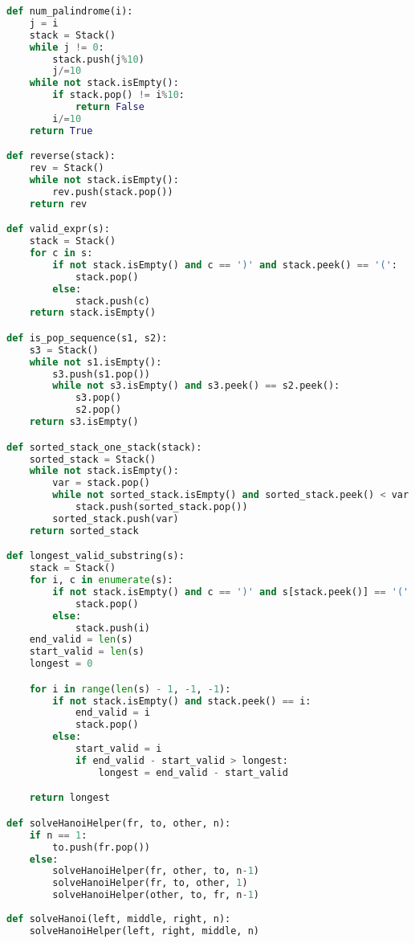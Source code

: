 \documentclass{article}
\begin{document}
\begin{lstlisting}[language=Python]
def num_palindrome(i):
    j = i
    stack = Stack()
    while j != 0:
        stack.push(j%10)
        j/=10
    while not stack.isEmpty():
        if stack.pop() != i%10:
            return False
        i/=10
    return True

def reverse(stack):
    rev = Stack()
    while not stack.isEmpty():
        rev.push(stack.pop())
    return rev

def valid_expr(s):
    stack = Stack()
    for c in s:
        if not stack.isEmpty() and c == ')' and stack.peek() == '(':
            stack.pop()
        else:
            stack.push(c)
    return stack.isEmpty()

def is_pop_sequence(s1, s2):
    s3 = Stack()
    while not s1.isEmpty():
        s3.push(s1.pop())
        while not s3.isEmpty() and s3.peek() == s2.peek():
            s3.pop()
            s2.pop()
    return s3.isEmpty()

def sorted_stack_one_stack(stack):
    sorted_stack = Stack()
    while not stack.isEmpty():
        var = stack.pop()
        while not sorted_stack.isEmpty() and sorted_stack.peek() < var:
            stack.push(sorted_stack.pop())
        sorted_stack.push(var)
    return sorted_stack

def longest_valid_substring(s):
    stack = Stack()
    for i, c in enumerate(s):
        if not stack.isEmpty() and c == ')' and s[stack.peek()] == '(':
            stack.pop()
        else:
            stack.push(i)
    end_valid = len(s)
    start_valid = len(s)
    longest = 0

    for i in range(len(s) - 1, -1, -1):
        if not stack.isEmpty() and stack.peek() == i:
            end_valid = i
            stack.pop()
        else:
            start_valid = i
            if end_valid - start_valid > longest:
                longest = end_valid - start_valid

    return longest

def solveHanoiHelper(fr, to, other, n):
    if n == 1:
        to.push(fr.pop())
    else:
        solveHanoiHelper(fr, other, to, n-1)
        solveHanoiHelper(fr, to, other, 1)
        solveHanoiHelper(other, to, fr, n-1)
        
def solveHanoi(left, middle, right, n):
    solveHanoiHelper(left, right, middle, n)

\end{lstlisting}
\end{document}
